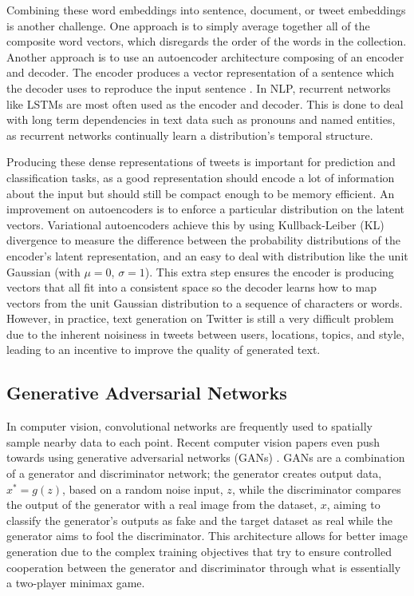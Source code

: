\documentclass{article}
\begin{document}
		Combining these word embeddings into sentence, document, or tweet embeddings is
		another challenge. One approach is to simply average together all of the composite
		word vectors, which disregards the order of the words in the collection. Another approach
		is to use an autoencoder architecture composing of an encoder and decoder. The
		encoder produces a vector representation of a sentence which the decoder uses
		to reproduce the input sentence . In NLP, recurrent networks
		like LSTMs are most often used as the encoder and decoder. This is done to deal
		with long term dependencies in text data such as pronouns and named entities,
		as recurrent networks continually learn a distribution's temporal structure.

		Producing these dense representations of tweets is important for prediction
		and classification tasks, as a good representation should encode a lot of information
		about the input but should still be compact enough to be memory efficient.
		An improvement on autoencoders is to enforce a particular distribution on the latent
		vectors. Variational autoencoders achieve this by using Kullback-Leiber (KL)
		divergence to measure the difference between the probability distributions of the
		encoder's latent representation, and an easy to deal with distribution like
		the unit Gaussian (with $\mu=0$, $\sigma=1$). This extra step ensures the
		encoder is producing vectors that all fit into a consistent space so the decoder
		learns how to map vectors from the unit Gaussian distribution to a sequence of
		characters or words. However, in practice, text generation on Twitter is still a very
		difficult problem due to the inherent noisiness in tweets between users, locations,
		topics, and style, leading to an incentive to improve the quality of generated text.

	\subsection{Generative Adversarial Networks}
		In computer vision, convolutional networks are frequently used
		to spatially sample nearby data to each point. Recent computer vision papers even
		push towards using generative adversarial networks (GANs) \parencite{Goodfellow2014}.
		GANs are a combination of a generator and discriminator network; the generator creates
		output data, $x^*=g(z)$, based on a random noise input, $z$, while the discriminator
		compares the output of the generator with a real image from the dataset, $x$, aiming to
		classify the generator's outputs as fake and the target dataset as real while the generator
		aims to fool the discriminator. This architecture allows for better image generation
		due to the complex training objectives that try to ensure controlled cooperation
		between the generator and discriminator through what is essentially a two-player
		minimax game.
\end{document}
